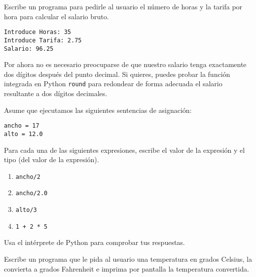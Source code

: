 \begin{ex}
Escribe un programa para pedirle al usuario el número de horas y la tarifa por hora para calcular
el salario bruto.
\begin{verbatim}
Introduce Horas: 35
Introduce Tarifa: 2.75
Salario: 96.25
\end{verbatim}
\end{ex}
%
Por ahora no es necesario preocuparse de que nuestro salario tenga exactamente dos
dígitos después del punto decimal. Si quieres, puedes probar la función integrada en Python
{\tt round} para redondear de forma adecuada el salario resultante
a dos dígitos decimales.

\begin{ex}
Asume que ejecutamos las siguientes sentencias de asignación:

\begin{verbatim}
ancho = 17
alto = 12.0
\end{verbatim}

Para cada una de las siguientes expresiones, escribe el valor de la
expresión y el tipo (del valor de la expresión).

\begin{enumerate}

\item {\tt ancho/2}

\item {\tt ancho/2.0}

\item {\tt alto/3}

\item {\tt 1 + 2 * 5}

\end{enumerate}

Usa el intérprete de Python para comprobar tus respuestas.
\end{ex}

\begin{ex}
Escribe un programa que le pida al usuario una temperatura en grados Celsius,
la convierta a grados Fahrenheit e imprima por pantalla
la temperatura convertida.
\end{ex}


